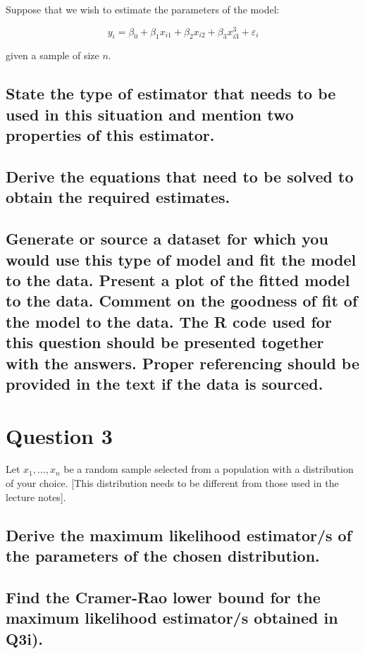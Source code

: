 \documentclass[]{article}
\begin{document}
Suppose that we wish to estimate the parameters of the model:

$$
y_i = \beta_0 + \beta_1 x_{i1} + \beta_2 x_{i2} + \beta_3 x_{i3}^3 + \varepsilon_i
$$

\noindent given a sample of size \( n \).

\subsection{State the type of estimator that needs to be used in this situation and mention two properties of this estimator.}

\subsection{Derive the equations that need to be solved to obtain the required estimates.}

\subsection{ Generate or source a dataset for which you would use this type of model and fit the model to the data.  Present a plot of the fitted model to the data.  Comment on the goodness of fit of the model to the data.  The R code used for this question should be presented together with the answers. Proper referencing should be provided in the text if the data is sourced.}



\section{Question 3}

Let \( x_1, \dots, x_n \) be a random sample selected from a population with a distribution of your choice. [This distribution needs to be different from those used in the lecture notes].

\subsection{Derive the maximum likelihood estimator/s of the parameters of the chosen distribution.}

\subsection{Find the Cramer-Rao lower bound for the maximum likelihood estimator/s obtained in Q3i).}
\end{document}
